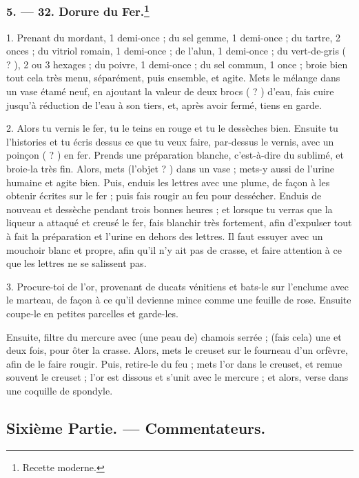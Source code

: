 \documentclass[a4paper, 11pt, oneside, polutonikogreek, french]{article}
\begin{document}
\subsubsection[5. --- 32. Dorure du Fer.]{5. --- 32. Dorure du Fer.\footnote{Recette moderne.}}

1. Prenant du mordant, 1 demi-once ; du sel gemme, 1 demi-once ; du tartre, 2 onces ; du vitriol romain, 1 demi-once ; de l'alun, 1 demi-once ; du vert-de-gris ( ? ), 2 ou 3 hexages ; du poivre, 1 demi-once ; du sel commun, 1 once ; broie bien tout cela très menu, séparément, puis ensemble, et agite. Mets le mélange dans un vase étamé neuf, en ajoutant la valeur de deux brocs ( ? ) d'eau, fais cuire jusqu'à réduction de l'eau à son tiers, et, après avoir fermé, tiens en garde.

2. Alors tu vernis le fer, tu le teins en rouge et tu le dessèches bien. Ensuite tu l'histories et tu écris dessus ce que tu veux faire, par-dessus le vernis, avec un poinçon ( ? ) en fer. Prends une préparation blanche, c'est-à-dire du sublimé, et broie-la très fin. Alors, mets (l'objet ? ) dans un vase ; mets-y aussi de l'urine humaine et agite bien. Puis, enduis les lettres avec une plume, de façon à les obtenir écrites sur le fer ; puis fais rougir au feu pour dessécher. Enduis de nouveau et dessèche pendant trois bonnes heures ; et lorsque tu verras que la liqueur a attaqué et creusé le fer, fais blanchir très fortement, afin d'expulser tout à fait la préparation et l'urine en dehors des lettres. Il faut essuyer avec un mouchoir blanc et propre, afin qu'il n'y ait pas de crasse, et faire attention à ce que les lettres ne se salissent pas.

3. Procure-toi de l'or, provenant de ducats vénitiens et bats-le sur l'enclume avec le marteau, de façon à ce qu'il devienne mince comme une feuille de rose. Ensuite coupe-le en petites parcelles et garde-les.

Ensuite, filtre du mercure avec (une peau de) chamois serrée ; (fais cela) une et deux fois, pour ôter la crasse. Alors, mets le creuset sur le fourneau d'un orfèvre, afin de le faire rougir. Puis, retire-le du feu ; mets l'or dans le creuset, et remue souvent le creuset ; l'or est dissous et s'unit avec le mercure ; et alors, verse dans une coquille de spondyle.

\bigskip
\centerline{\EightStarTaper}
\centerline{\EightStarTaper\EightStarTaper}
\bigskip

\subsection{Sixième Partie. --- Commentateurs.}
\end{document}
